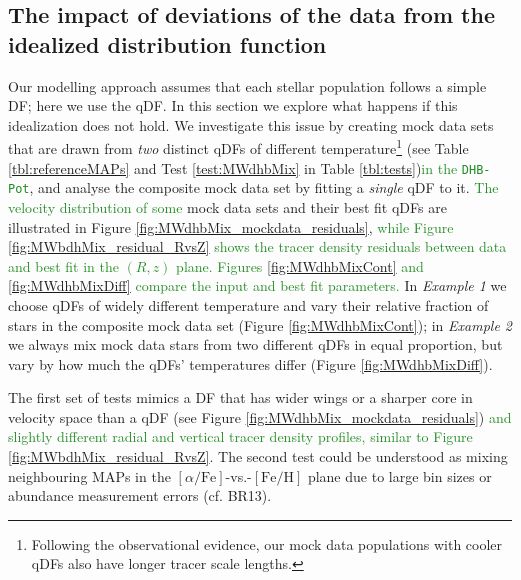 \documentclass[iop,revtex4]{emulateapj}
\newcommand{\MAPs}{MAPs}
\newcommand{\NEW}[1]{\textcolor{ForestGreen}{#1}}
\newcommand{\OLD}[1]{}
\begin{document}
\subsection{The impact of deviations of the data from the idealized distribution function} \label{sec:results_mixedDFs}

Our modelling approach assumes that each stellar population follows a simple DF; here we use the qDF. In this section we explore what happens if this idealization does not hold. We investigate this issue by creating mock data sets that are drawn from \emph{two} distinct qDFs of different temperature\footnote{Following the observational evidence, our mock data populations with cooler qDFs also have longer tracer scale lengths.} (see Table \ref{tbl:referenceMAPs} and Test \ref{test:MWdhbMix} in Table \ref{tbl:tests})\NEW{in the \texttt{DHB-Pot}}, and analyse the composite mock data set by fitting a \emph{single} qDF to it. \NEW{The velocity distribution of some}\OLD{Some} mock data sets and their best fit qDFs are illustrated in Figure \ref{fig:MWdhbMix_mockdata_residuals}, \NEW{while Figure \ref{fig:MWbdhMix_residual_RvsZ} shows the tracer density residuals between data and best fit in the $(R,z)$ plane. Figures \ref{fig:MWdhbMixCont} and \ref{fig:MWdhbMixDiff} compare the input and best fit parameters.}\OLD{and the comparison of input and best fit parameters in Figures \ref{fig:MWdhbMixCont} and \ref{fig:MWdhbMixDiff}.} In \emph{Example 1} we choose qDFs of widely different temperature and vary their relative fraction of stars in the composite mock data set (Figure \ref{fig:MWdhbMixCont}); in \emph{Example 2} we always mix mock data stars from two different qDFs in equal proportion, but vary by how much the qDFs' temperatures differ (Figure \ref{fig:MWdhbMixDiff}). 

The first set of tests mimics a DF that has wider wings or a sharper core in velocity space than a qDF (see Figure \ref{fig:MWdhbMix_mockdata_residuals}) \NEW{and slightly different radial and vertical tracer density profiles, similar to Figure \ref{fig:MWbdhMix_residual_RvsZ}}. The second test could be understood as mixing neighbouring \MAPs{} in the $[\alpha/\mathrm{Fe}]$-vs.-$[\mathrm{Fe}/\mathrm{H}]$ plane due to large bin sizes or abundance measurement errors (cf. BR13). 
\end{document}
